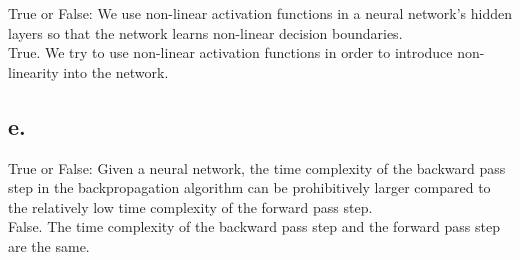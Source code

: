 \documentclass{article}
\newcommand{\1}{\mathbf{1}}
\begin{document}
{True or False: We use non-linear activation functions in a neural network’s hidden layers so that the network learns non-linear decision boundaries. \\

True. We try to use non-linear activation functions in order to introduce non-linearity into the network. 

\subsection*{e.}

True or False: Given a neural network, the time complexity of the backward pass step in the backpropagation algorithm can be prohibitively larger compared to the relatively low time complexity of the forward pass step. \\

False. The time complexity of the backward pass step and the forward pass step are the same. 

}
\end{document}
